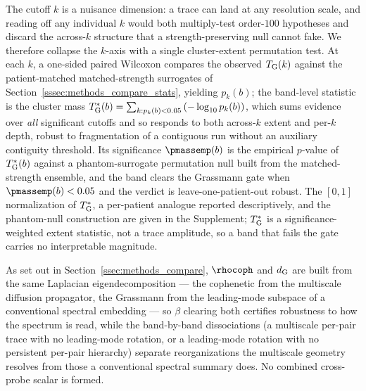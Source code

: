 The cutoff \(k\) is a nuisance dimension: a trace can land at any resolution scale, and reading off any individual \(k\) would both multiply-test order-\(100\) hypotheses and discard the across-\(k\) structure that a strength-preserving null cannot fake. We therefore collapse the \(k\)-axis with a single cluster-extent permutation test. At each \(k\), a one-sided paired Wilcoxon compares the observed \(T_{\rm G}(k)\) against the patient-matched matched-strength surrogates of Section~\ref{sssec:methods_compare_stats}, yielding \(p_{k}(b)\); the band-level statistic is the cluster mass \(T_{\rm G}^{\ast}(b) = \sum_{k : p_{k}(b) < 0.05}\left(-\log_{10} p_{k}(b)\right)\), which sums evidence over \emph{all} significant cutoffs and so responds to both across-\(k\) extent and per-\(k\) depth, robust to fragmentation of a contiguous run without an auxiliary contiguity threshold. Its significance \(\pmassemp(b)\) is the empirical \(p\)-value of \(T_{\rm G}^{\ast}(b)\) against a phantom-surrogate permutation null built from the matched-strength ensemble, and the band clears the Grassmann gate when \(\pmassemp(b) < 0.05\) and the verdict is leave-one-patient-out robust. The \([0,1]\) normalization of \(T_{\rm G}^{\ast}\), a per-patient analogue reported descriptively, and the phantom-null construction are given in the Supplement; \(T_{\rm G}^{\ast}\) is a significance-weighted extent statistic, not a trace amplitude, so a band that fails the gate carries no interpretable magnitude.

As set out in Section~\ref{ssec:methods_compare}, \(\rhocoph\) and \(d_{\rm G}\) are built from the same Laplacian eigendecomposition --- the cophenetic from the multiscale diffusion propagator, the Grassmann from the leading-mode subspace of a conventional spectral embedding --- so \(\beta\) clearing both certifies robustness to how the spectrum is read, while the band-by-band dissociations (a multiscale per-pair trace with no leading-mode rotation, or a leading-mode rotation with no persistent per-pair hierarchy) separate reorganizations the multiscale geometry resolves from those a conventional spectral summary does. No combined cross-probe scalar is formed.



